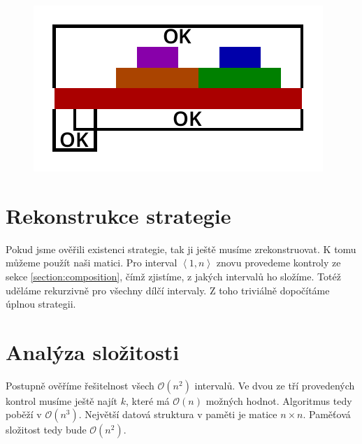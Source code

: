\documentclass{article}
\begin{document}
\begin{figure}[H]
    \centering
    \includegraphics[scale=1]{solve-extended-layer.pdf}
\end{figure}

\section{Rekonstrukce strategie}

Pokud jsme ověřili existenci strategie, tak ji ještě musíme zrekonstruovat. K tomu můžeme použít naši matici. Pro interval $\left<1, n\right>$ znovu provedeme kontroly ze sekce \ref{section:composition}, čímž zjistíme, z jakých intervalů ho složíme. Totéž uděláme rekurzivně pro všechny dílčí intervaly. Z toho triviálně dopočítáme úplnou strategii.

\section{Analýza složitosti}
\label{section:analysis}

Postupně ověříme řešitelnost všech $\mathcal{O}\left(n^2\right)$ intervalů. Ve dvou ze tří provedených kontrol musíme ještě najít $k$, které má $\mathcal{O}\left(n\right)$ možných hodnot. Algoritmus tedy poběží v $\mathcal{O}\left(n^3\right)$. Největší datová struktura v paměti je matice $n \times n$. Paměťová složitost tedy bude $\mathcal{O}\left(n^2\right)$.
\end{document}
